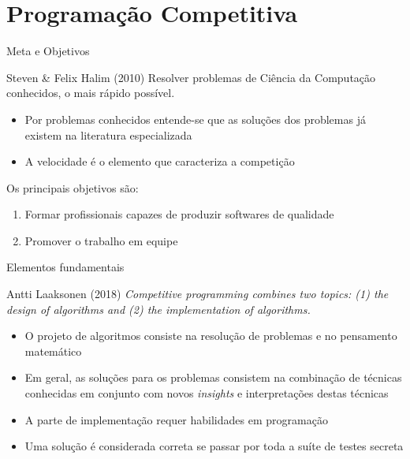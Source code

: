 \section{Programação Competitiva}

\begin{frame}[fragile]{Meta e Objetivos}

    \begin{block}{Steven \& Felix Halim (2010)}
    Resolver problemas de Ciência da Computação conhecidos, o mais rápido possível.
    \end{block}

    \begin{itemize}
        \item Por problemas conhecidos entende-se que as soluções dos problemas já existem 
        na literatura especializada
        \item A velocidade é o elemento que caracteriza a competição
    \end{itemize}

    Os principais objetivos são:

    \begin{enumerate}
        \item Formar profissionais capazes de produzir softwares de qualidade
        \item Promover o trabalho em equipe
    \end{enumerate}

\end{frame}


\begin{frame}[fragile]{Elementos fundamentais}

    \begin{block}{Antti Laaksonen (2018)}
    \textit{Competitive programming combines two topics: (1) the design of algorithms and
    (2) the implementation of algorithms.}
    \end{block}

    \begin{itemize}
        \item O projeto de algoritmos consiste na resolução de problemas e no pensamento
        matemático
        \item Em geral, as soluções para os problemas consistem na combinação de técnicas
        conhecidas em conjunto com novos \textit{insights} e interpretações destas técnicas
        \item A parte de implementação requer habilidades em programação
        \item Uma solução é considerada correta se passar por toda a suíte de testes secreta
    \end{itemize}

\end{frame}
